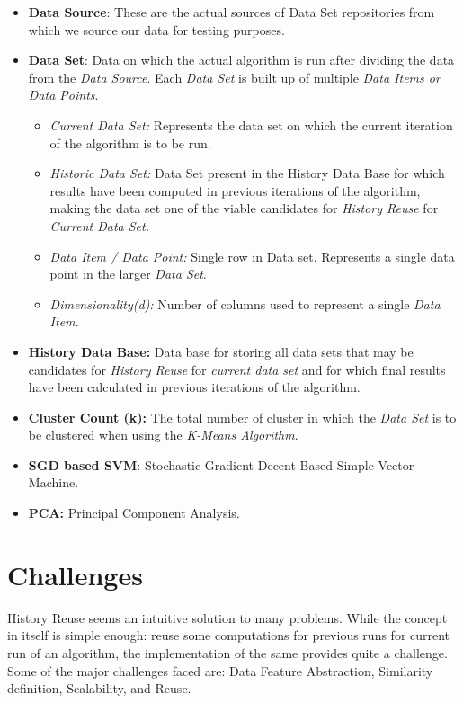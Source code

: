 \documentclass{vldb}
\begin{document}
\begin{itemize}
	\item \textbf{Data Source}: These are the actual sources of Data Set repositories from which we source our data for testing purposes.
	\item \textbf{Data Set}: Data on which the actual algorithm is run after dividing the data from the \textit{Data Source}. Each \textit{Data Set} is built up of multiple \textit{Data Items or Data Points}.
	\begin{itemize}
		\item \textit{Current Data Set:} Represents the data set on which the current iteration of the algorithm is to be run.
		\item \textit{Historic Data Set:} Data Set present in the History Data Base for which results have been computed in previous iterations of the algorithm, making the data set one of the viable candidates for \textit{History Reuse} for \textit{Current Data Set.}
		\item \textit{Data Item / Data Point:} Single row in Data set. Represents a single data point in the larger \textit{Data Set}.
		\item \textit{Dimensionality(d):} Number of columns used to represent a single \textit{Data Item.}
	\end{itemize}
	\item \textbf{History Data Base:} Data base for storing all data sets that may be candidates for \textit{History Reuse} for \textit{current data set} and for which final results have been calculated in previous iterations of the algorithm.
	\item \textbf{Cluster Count (k):} The total number of cluster in which the \textit{Data Set} is to be clustered when using the \textit{K-Means Algorithm}.
	\item \textbf{SGD based SVM}: Stochastic Gradient Decent Based Simple Vector Machine. \cite{sgd_svm}
	\item \textbf{PCA: } Principal Component Analysis. \cite{pca}\cite{pca_visual}	
\end{itemize}

\section{Challenges}
\label{chap-three}
History Reuse seems an intuitive solution to many problems. While the concept in itself is simple enough: reuse some computations for previous runs for current run of an algorithm, the implementation of the same provides quite a challenge. Some of the major challenges faced are: Data Feature Abstraction, Similarity definition, Scalability, and Reuse.
\end{document}
